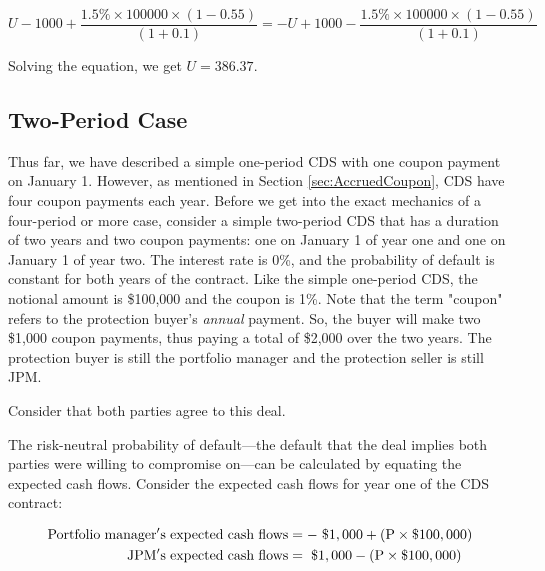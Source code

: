 \documentclass{jss}
\begin{document}
$$U - 1000 + \frac{1.5\% \times 100000\times (1 - 0.55)}{(1 + 0.1)} = - U + 1000 - \frac{1.5\%\times100000\times(1 - 0.55)}{(1 + 0.1)}$$

Solving the equation, we get $U = 386.37$. \\

\subsection{Two-Period Case}
\label{sec:TwoPeriod}


Thus far, we have described a simple one-period CDS with one coupon payment on January 1. However, as mentioned in Section \ref{sec:AccruedCoupon}, CDS have four coupon payments each year. Before we get into the exact mechanics of a four-period or more case, consider a simple two-period CDS that has a duration of two years and 
two coupon payments: one on January 1 of year one and one on January 1 of year two. The interest rate is 0\%, and the probability of default is constant for both years of the contract. Like the simple one-period CDS, the notional amount is \$100,000 and the coupon is 1\%. Note that the term "coupon" refers to the protection buyer's \emph{annual} payment. So, the buyer will make two \$1,000 coupon payments, thus paying a total of \$2,000 over the two years. The protection buyer is still the portfolio manager and the protection seller is still JPM. 

Consider that both parties agree to this deal. 

The risk-neutral probability of default---the default that the deal implies both parties were willing to compromise on---can be calculated by equating the expected cash flows. Consider the expected cash flows for year one of the CDS contract:

\begin{align}
  \rm Portfolio\hspace{3pt}manager's\hspace{3pt}expected\hspace{3pt}cash\hspace{3pt}flows &= \rm -\hspace{3pt}\$1,000 + (P \times {\$100,000}) \\
  \rm JPM's\hspace{3pt}expected\hspace{3pt}cash\hspace{3pt}flows &= \rm \hspace{3pt}\$1,000 - (P \times {\$100,000})
\end{align}
\end{document}
